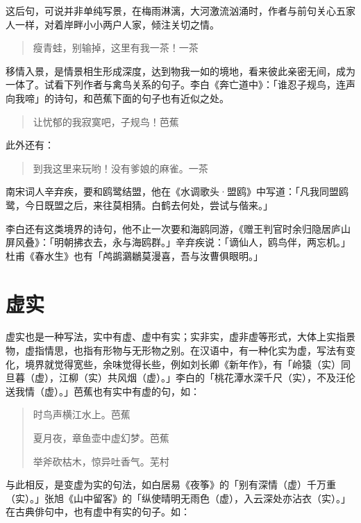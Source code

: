{    这后句，可说并非单纯写景，在梅雨淋漓，大河激流汹涌时，作者与前句关心五家人一样，对着岸畔小小两户人家，倾注关切之情。

    \begin{quote}
        瘦青蛙，别输掉，这里有我一茶！\hfill 一茶
    \end{quote}

    移情入景，是情景相生形成深度，达到物我一如的境地，看来彼此亲密无间，成为一体了。试看下列作者与禽鸟关系的句子。李白《奔亡道中》：「谁忍子规鸟，连声向我啼」的诗句，和芭蕉下面的句子也有近似之处。

    \begin{quote}
        让忧郁的我寂寞吧，子规鸟！\hfill 芭蕉
    \end{quote}

    此外还有：
    \begin{quote}
        到我这里来玩哟！没有爹娘的麻雀。\hfill 一茶
    \end{quote}

    南宋词人辛弃疾，要和鸥鹭结盟，他在《水调歌头·盟鸥》中写道：「凡我同盟鸥鹭，今日既盟之后，来往莫相猜。白鹤去何处，尝试与偕来。」

    李白还有这类境界的诗句，他不止一次要和海鸥同游，《赠王判官时余归隐居庐山屏风叠》：「明朝拂衣去，永与海鸥群。」辛弃疾说：「谪仙人，鸥鸟伴，两忘机。」杜甫《春水生》也有「鸬鹚鸂鶒莫漫喜，吾与汝曹俱眼明。」

    \section*{\FS 虚实}

    虚实也是一种写法，实中有虚、虚中有实；实非实，虚非虚等形式，大体上实指景物，虚指情思，也指有形物与无形物之别。在汉语中，有一种化实为虚，写法有变化，境界就觉得宽些，余味觉得长些，例如刘长卿《新年作》，有「岭猿（实）同旦暮（虚），江柳（实）共风烟（虚）。」李白的「桃花潭水深千尺（实），不及汪伦送我情（虚）。」芭蕉也有实中有虚的句，如：

    \begin{quote}
        时鸟声横江水上。\hfill 芭蕉

        夏月夜，章鱼壶中虚幻梦。\hfill 芭蕉

        举斧砍枯木，惊异吐香气。\hfill 芜村
    \end{quote}

    与此相反，是变虚为实的句法，如白居易《夜筝》的「别有深情（虚）千万重（实）。」张旭《山中留客》的「纵使晴明无雨色（虚），入云深处亦沾衣（实）。」在古典俳句中，也有虚中有实的句子。如：

}

